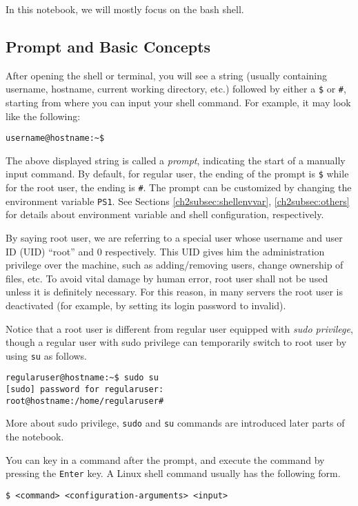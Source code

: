 In this notebook, we will mostly focus on the bash shell.

\subsection{Prompt and Basic Concepts}

After opening the shell or terminal, you will see a string (usually containing username, hostname, current working directory, etc.) followed by either a \verb|$| or \verb|#|, starting from where you can input your shell command. For example, it may look like the following:
\begin{lstlisting}
username@hostname:~$
\end{lstlisting}

The above displayed string is called a \textit{prompt}, indicating the start of a manually input command. By default, for regular user, the ending of the prompt is \verb|$| while for the root user, the ending is \verb|#|. The prompt can be customized by changing the environment variable \verb|PS1|. See Sections \ref{ch2subsec:shellenvvar}, \ref{ch2subsec:others} for details about environment variable and shell configuration, respectively.

By saying root user, we are referring to a special user whose username and user ID (UID) ``root'' and $0$ respectively. This UID gives him the administration privilege over the machine, such as adding/removing users, change ownership of files, etc. To avoid vital damage by human error, root user shall not be used unless it is definitely necessary. For this reason, in many servers the root user is deactivated (for example, by setting its login password to invalid).

Notice that a root user is different from regular user equipped with \textit{sudo privilege}, though a regular user with sudo privilege can temporarily switch to root user by using \verb|su| as follows.
\begin{lstlisting}
regularuser@hostname:~$ sudo su
[sudo] password for regularuser:
root@hostname:/home/regularuser#
\end{lstlisting}

More about sudo privilege, \verb|sudo| and \verb|su| commands are introduced later parts of the notebook.

You can key in a command after the prompt, and execute the command by pressing the \verb|Enter| key. A Linux shell command usually has the following form.
\begin{lstlisting}
$ <command> <configuration-arguments> <input>
\end{lstlisting}

